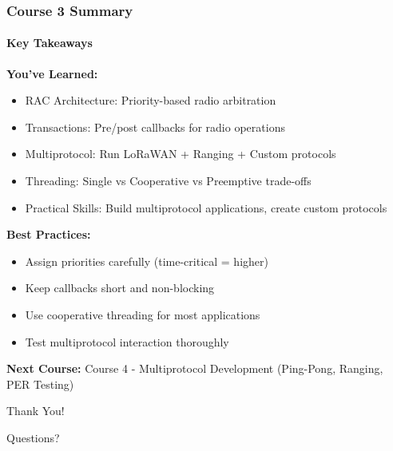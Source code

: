 \documentclass{beamer}
\begin{document}
\begin{frame}
\frametitle{Course 3 Summary}
\framesubtitle{Key Takeaways}

\textbf{You've Learned:}
\begin{itemize}
    \item RAC Architecture: Priority-based radio arbitration
    \item Transactions: Pre/post callbacks for radio operations
    \item Multiprotocol: Run LoRaWAN + Ranging + Custom protocols
    \item Threading: Single vs Cooperative vs Preemptive trade-offs
    \item Practical Skills: Build multiprotocol applications, create custom protocols
\end{itemize}

\vspace{1em}

\textbf{Best Practices:}
\begin{itemize}
    \item Assign priorities carefully (time-critical = higher)
    \item Keep callbacks short and non-blocking
    \item Use cooperative threading for most applications
    \item Test multiprotocol interaction thoroughly
\end{itemize}

\vspace{1em}

\textbf{Next Course:} Course 4 - Multiprotocol Development (Ping-Pong, Ranging, PER Testing)
\end{frame}

\begin{frame}[plain]
\centering
\Huge Thank You!

\vspace{2em}

\large Questions?

\vspace{2em}

\normalsize

\end{frame}
\end{document}
